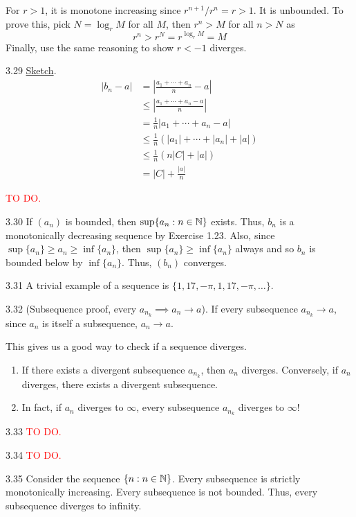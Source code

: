 For $r > 1$, it is monotone increasing since $r^{n+1}/r^n=r>1$. It is unbounded. To prove this, pick $N=\log_r{M}$ for all $M$, then $r^n>M$ for all $n>N$ as
\[
    r^n > r^N= r^{\log_r{M}}=M
    \]
Finally, use the same reasoning to show $r<-1$ diverges.

3.29 \underline{Sketch}. 
\begin{align}
    |b_n - a| &= |\frac{a_1 + \cdots + a_n}{n} - a| \\
    &\leq  |\frac{a_1 + \cdots + a_n - a}{n}| \\
    &= \frac{1}{n}|a_1 + \cdots + a_n - a| \\
    &\leq \frac{1}{n} (|a_1|+\cdots+|a_n|+|a|) \\
    &\leq \frac{1}{n} (n|C|+|a|) \\
    &= |C|+\frac{|a|}{n}
\end{align}

\textcolor{red}{TO DO.}

3.30 If $(a_n)$ is bounded, then $\sup \{a_n : n \in \mathbb{N} \}$ exists. Thus, $b_n$ is a monotonically decreasing sequence by Exercise 1.23.
Also, since $\sup\{a_n\} \geq a_n \geq \inf\{a_n\}$, then $\sup\{a_n\} \geq \inf\{a_n\}$ always and so $b_n$ is bounded below by $\inf\{a_n\}$.
Thus, $(b_n)$ converges.

3.31 A trivial example of a sequence is $\{1,17,-\pi,1,17,-\pi,\dots \}$. 

3.32 (Subsequence proof, every $a_{n_k} \implies a_n \rightarrow a$). If every subsequence $a_{n_k} \rightarrow a$, since $a_n$ is itself a subsequence, $a_n \rightarrow a$.

\begin{remark}
    This gives us a good way to check if a sequence diverges. 
    \begin{enumerate}
        \item If there exists a divergent subsequence $a_{n_k}$, then $a_n$ diverges. Conversely, if $a_n$ diverges, there exists a divergent subsequence.
        \item In fact, if $a_n$ diverges to $\infty$, every subsequence $a_{n_k}$ diverges to $\infty$!
    \end{enumerate}
\end{remark}

3.33 \textcolor{red}{TO DO.}

3.34 \textcolor{red}{TO DO.}

3.35 Consider the sequence $\{n: n\in\mathbb{N}\}$. Every subsequence is strictly monotonically increasing. Every subsequence is not bounded. Thus, every subsequence diverges to infinity.

